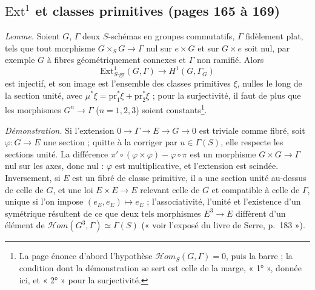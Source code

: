 \documentclass[11pt,a4paper]{article}
\begin{document}
\subsection*{$\mathrm{Ext}^1$ et classes primitives (pages 165 à 169)}

\emph{Lemme.} Soient $G$, $\Gamma$ deux $S$-schémas en groupes commutatifs, $\Gamma$
fidèlement plat, tels que tout morphisme $G \times_S G \to \Gamma$ nul sur $e \times
G$ et sur $G \times e$ soit nul, par exemple $G$ à fibres géométriquement
connexes et $\Gamma$ non ramifié. Alors
\[
\mathrm{Ext}^1_{S\text{-gr}}(G, \Gamma) \longrightarrow H^1(G, \Gamma_G)
\]
est injectif, et son image est l'ensemble des classes primitives $\xi$, nulles le
long de la section unité, avec $\mu^{*}\xi = \mathrm{pr}_1^{*}\xi + \mathrm{pr}_2^{*}\xi$
; pour la surjectivité, il faut de plus que les morphismes $G^n \to \Gamma$
($n = 1, 2, 3$) soient constants\footnote{La page énonce d'abord l'hypothèse
$\mathcal{H}om_S(G, \Gamma) = 0$, puis la barre ; la condition dont la
démonstration se sert est celle de la marge, « 1° », donnée ici, et « 2° » pour la
surjectivité.}.

\emph{Démonstration.} Si l'extension $0 \to \Gamma \to E \to G \to 0$ est triviale
comme fibré, soit $\varphi : G \to E$ une section ; quitte à la corriger par
$u \in \Gamma(S)$, elle respecte les sections unité. La différence $\pi' \circ
(\varphi \times \varphi) - \varphi \circ \pi$ est un morphisme $G \times G \to
\Gamma$ nul sur les axes, donc nul : $\varphi$ est multiplicative, et l'extension
est scindée. Inversement, si $E$ est un fibré de classe primitive, il a une
section unité au-dessus de celle de $G$, et une loi $E \times E \to E$ relevant
celle de $G$ et compatible à celle de $\Gamma$, unique si l'on impose
$(e_E, e_E) \mapsto e_E$ ; l'associativité, l'unité et l'existence d'un symétrique
résultent de ce que deux tels morphismes $E^3 \to E$ diffèrent d'un élément de
$\mathcal{H}om(G^3, \Gamma) \simeq \Gamma(S)$ (« voir l'exposé du livre de Serre,
p.~183 »).
\end{document}
